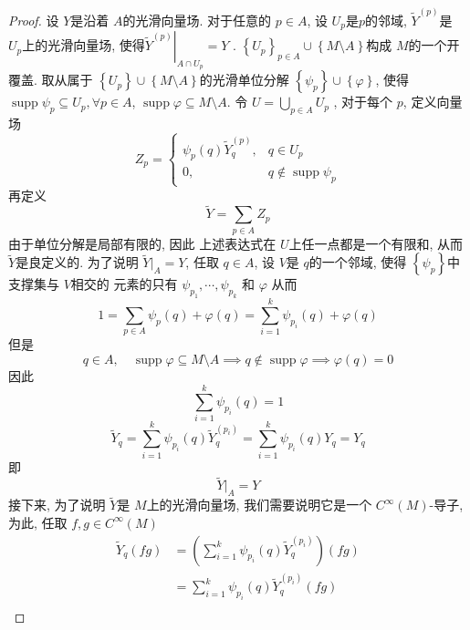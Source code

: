 \documentclass[../main.tex]{subfiles}
\begin{document}
\begin{proof}
    设 \(  Y  \)是沿着 \(  A  \)的光滑向量场. 对于任意的 \(  p \in A \), 设 \(  U_{p}  \)是\(  p  \)的邻域,  \(  \tilde{Y}^{\left( p \right) }  \)是 \(  U _{p} \)上的光滑向量场,        使得\(  \left. \tilde{Y}^{\left( p \right) } \right|_{A\cap U_{p}}= Y  \) . \(  \left\{ U_{p} \right\}_{p \in A}\cup \left\{ M\setminus A \right\}  \)构成 \( M  \)的一个开覆盖. 取从属于 \(  \left\{ U_{p} \right\} \cup \left\{ M\setminus A \right\} \)的光滑单位分解 \(  \left\{ \psi _{p} \right\} \cup \left\{  \varphi  \right\} \), 使得 \(  \operatorname{supp}\psi _{p}\subseteq U_{p}  ,\forall p \in A\), \(  \operatorname{supp} \varphi \subseteq M\setminus A  \). 令 \(  U= \bigcup _{p \in A}U_{p}  \) , 对于每个 \(  p  \), 定义向量场 \[
    Z_{p}= \begin{cases} \psi _{p}\left( q \right) \tilde{Y}^{\left( p \right) }_{q},& q \in U_{p}\\ 
     0,& q \not \in  \operatorname{supp}\psi _{p}\end{cases} 
    \]   再定义 \[
    \tilde{Y}= \sum _{p \in A} Z_{p}
    \] 由于单位分解是局部有限的, 因此 上述表达式在 \(  U  \)上任一点都是一个有限和,  从而 \(  \tilde{Y}  \)是良定义的.  为了说明 \(  \tilde{Y}|_{A}= Y  \), 任取  \(  q \in A  \), 设 \(  V  \)是 \(  q  \)的一个邻域, 使得 \(  \left\{ \psi _{p} \right\}  \)中支撑集与 \(  V  \)相交的 元素的只有   \(  \psi_{p_1},\cdots ,\psi _{p_{k}}  \)    和 \(  \varphi   \) 从而\[
     1= \sum _{p \in A}\psi _{p}\left( q \right)+  \varphi \left( q \right)  = \sum _{i= 1}^{k}\psi _{p_{i}}\left( q \right) +  \varphi \left( q \right) 
    \] 但是 \[
    q \in A,\quad  \operatorname{supp} \varphi \subseteq M\setminus A\implies q\not \in \operatorname{supp} \varphi \implies  \varphi \left( q \right)= 0 
    \]因此 \[
    \sum _{i= 1}^{k}\psi _{p_{i}}\left( q \right)= 1 
    \]\[
    \tilde{Y}_{q}= \sum _{i= 1}^{k}\psi _{p_{i}}\left( q \right) \tilde{Y}_{q}^{\left( p_{i} \right) } = \sum _{i= 1}^{k}\psi _{p_{i}}\left( q \right) Y_{q}= Y_{q}
    \]即 \[
    \tilde{Y}|_{A}= Y
    \]接下来, 为了说明 \(  \tilde{Y}  \)是 \(  M  \)上的光滑向量场, 我们需要说明它是一个 \(  C^{\infty}\left( M \right)   \)-导子, 为此, 任取 \(  f,g \in C^{\infty}\left( M \right)   \)     \[
   \begin{aligned}
    \tilde{Y}_{q}\left( fg \right)&= \left( \sum _{i= 1}^{k}\psi _{p_{i}}\left( q \right)  \tilde{Y}_{q}^{\left( p_{i} \right) }\right)\left( fg \right) \\ 
     &= \sum _{i= 1}^{k}\psi _{p_{i}}\left( q \right)  \tilde{Y}_{q}^{\left( p _{i}\right) }\left( fg \right)\\ 

\end{aligned}\]
\end{proof}
\end{document}
